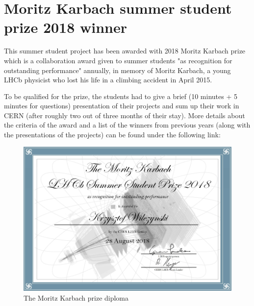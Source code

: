 \documentclass{customization}
\begin{document}

\section{Moritz Karbach summer student prize 2018 winner}
\hspace{0.6cm}

This summer student project has been awarded with 2018 Moritz Karbach prize which is a collaboration award given to summer students "as recognition for outstanding performance" annually, in memory of Moritz Karbach, a young LHCb physicist who lost his life in a climbing accident in April 2015.
\newline

\noindent
To be qualified for the prize, the students had to give a brief (10 minutes + 5 minutes for questions) presentation of their projects and sum up their work in CERN (after roughly two out of three months of their stay). More details about the criteria of the award and a list of the winners from previous years (along with the presentations of the projects) can be found under the following link:
\newline

\noindent{}
\vspace{0.6cm}

\begin{figure}[H]
\centering
    \includegraphics[scale=0.42]{images/Certificate.png}
    \caption{The Moritz Karbach prize diploma}
    \label{fig:diploma}
\end{figure}
\end{document}

